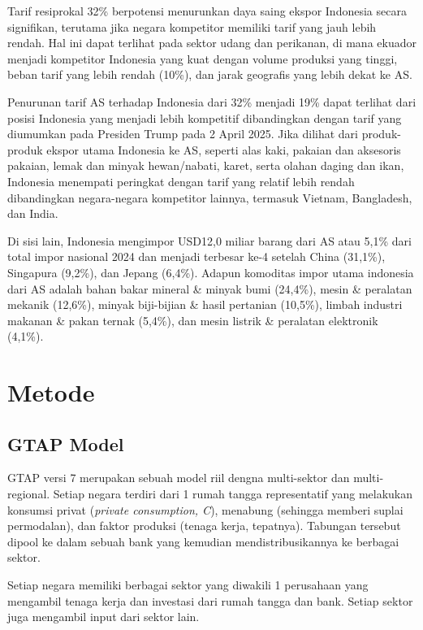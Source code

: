 \documentclass[
]{interact}
\begin{document}
Tarif resiprokal 32\% berpotensi menurunkan daya saing ekspor Indonesia
secara signifikan, terutama jika negara kompetitor memiliki tarif yang
jauh lebih rendah. Hal ini dapat terlihat pada sektor udang dan
perikanan, di mana ekuador menjadi kompetitor Indonesia yang kuat dengan
volume produksi yang tinggi, beban tarif yang lebih rendah (10\%), dan
jarak geografis yang lebih dekat ke AS.

Penurunan tarif AS terhadap Indonesia dari 32\% menjadi 19\% dapat
terlihat dari posisi Indonesia yang menjadi lebih kompetitif
dibandingkan dengan tarif yang diumumkan pada Presiden Trump pada 2
April 2025. Jika dilihat dari produk-produk ekspor utama Indonesia ke
AS, seperti alas kaki, pakaian dan aksesoris pakaian, lemak dan minyak
hewan/nabati, karet, serta olahan daging dan ikan, Indonesia menempati
peringkat dengan tarif yang relatif lebih rendah dibandingkan
negara-negara kompetitor lainnya, termasuk Vietnam, Bangladesh, dan
India.

Di sisi lain, Indonesia mengimpor USD12,0 miliar barang dari AS atau
5,1\% dari total impor nasional 2024 dan menjadi terbesar ke-4 setelah
China (31,1\%), Singapura (9,2\%), dan Jepang (6,4\%). Adapun komoditas
impor utama indonesia dari AS adalah bahan bakar mineral \& minyak bumi
(24,4\%), mesin \& peralatan mekanik (12,6\%), minyak biji-bijian \&
hasil pertanian (10,5\%), limbah industri makanan \& pakan ternak
(5,4\%), dan mesin listrik \& peralatan elektronik (4,1\%).

\section{Metode}\label{metode}

\subsection{GTAP Model}\label{gtap-model}

GTAP versi 7 merupakan sebuah model riil dengna multi-sektor dan
multi-regional. Setiap negara terdiri dari 1 rumah tangga representatif
yang melakukan konsumsi privat (\emph{private consumption, C}), menabung
(sehingga memberi suplai permodalan), dan faktor produksi (tenaga kerja,
tepatnya). Tabungan tersebut dipool ke dalam sebuah bank yang kemudian
mendistribusikannya ke berbagai sektor.

Setiap negara memiliki berbagai sektor yang diwakili 1 perusahaan yang
mengambil tenaga kerja dan investasi dari rumah tangga dan bank. Setiap
sektor juga mengambil input dari sektor lain.
\end{document}
